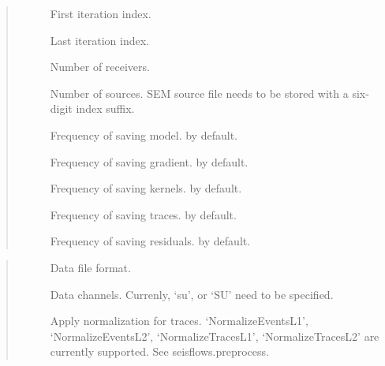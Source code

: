 \documentclass[letterpaper,10pt,english]{sphinxmanual}
\begin{document}
\begin{quote}\begin{description}
\item[{}] \leavevmode
First iteration index.

\item[{}] \leavevmode
Last iteration index.

\item[{}] \leavevmode
Number of receivers.

\item[{}] \leavevmode
Number of sources. SEM source file needs to be stored with a six-digit index suffix.

\item[{}] \leavevmode
Frequency of saving model.  by default.

\item[{}] \leavevmode
Frequency of saving gradient.  by default.

\item[{}] \leavevmode
Frequency of saving kernels.  by default.

\item[{}] \leavevmode
Frequency of saving traces.  by default.

\item[{}] \leavevmode
Frequency of saving residuals.  by default.

\end{description}\end{quote}

\begin{quote}\begin{description}
\item[{}] \leavevmode
Data file format.

\item[{}] \leavevmode
Data channels. Currenly, ‘su’, or ‘SU’ need to be specified.

\item[{}] \leavevmode
Apply normalization for traces. ‘NormalizeEventsL1’, ‘NormalizeEventsL2’, ‘NormalizeTracesL1’, ‘NormalizeTracesL2’ are currently supported. See seisflows.preprocess.

\end{description}\end{quote}
\end{document}
